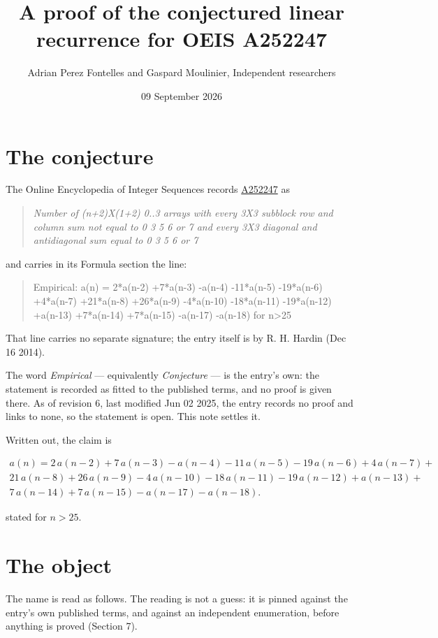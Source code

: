 \documentclass[11pt]{article}
\title{A proof of the conjectured linear recurrence for OEIS A252247}
\author{Adrian Perez Fontelles and Gaspard Moulinier, Independent researchers}
\date{09 September 2026}
\theoremstyle{definition}
\begin{document}
\maketitle
\section{The conjecture}

The Online Encyclopedia of Integer Sequences records \href{https://oeis.org/A252247}{A252247} as

\begin{quote}\itshape Number of (n+2)X(1+2) 0..3 arrays with every 3X3 subblock row and column sum not equal to 0 3 5 6 or 7 and every 3X3 diagonal and antidiagonal sum equal to 0 3 5 6 or 7\end{quote}

and carries in its Formula section the line:

\begin{quote}\ttfamily Empirical: a(n) = 2*a(n-2) +7*a(n-3) -a(n-4) -11*a(n-5) -19*a(n-6) +4*a(n-7) +21*a(n-8) +26*a(n-9) -4*a(n-10) -18*a(n-11) -19*a(n-12) +a(n-13) +7*a(n-14) +7*a(n-15) -a(n-17) -a(n-18) for n>25\end{quote}

That line carries no separate signature; the entry itself is by R. H. Hardin (Dec 16 2014).

The word {\itshape Empirical} --- equivalently {\itshape Conjecture} --- is the entry's own: the statement is recorded as fitted to the published terms, and no proof is given there. As of revision 6, last modified Jun 02 2025, the entry records no proof and links to none, so the statement is open. This note settles it.

Written out, the claim is

\begin{multline*} a(n) = 2\,a(n-2) + 7\,a(n-3) - a(n-4) - 11\,a(n-5) - 19\,a(n-6) + 4\,a(n-7) + \\ 21\,a(n-8) + 26\,a(n-9) - 4\,a(n-10) - 18\,a(n-11) - 19\,a(n-12) + a(n-13) + \\ 7\,a(n-14) + 7\,a(n-15) - a(n-17) - a(n-18). \end{multline*}

stated for $n > 25$.

\section{The object}

The name is read as follows. The reading is not a guess: it is pinned against the entry's own published terms, and against an independent enumeration, before anything is proved (Section 7).
\end{document}
